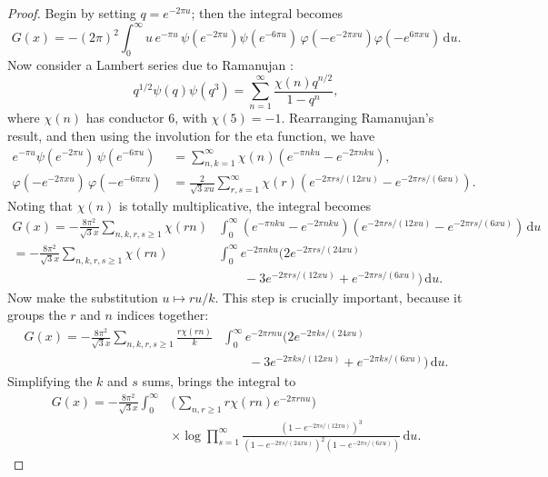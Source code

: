 \documentclass[12pt,reqno]{amsart}
\theoremstyle{remark}
\begin{document}
\begin{proof}
Begin by setting $q=e^{-2\pi u}$; then the integral becomes
\begin{equation*}
G(x)=-(2\pi)^2\int_{0}^{\infty}u\,e^{-\pi u}\,\psi(e^{-2\pi
u})\psi(e^{-6\pi u})\,\varphi(-e^{-2\pi x u})\varphi(-e^{6\pi x
u})\,{{\mathrm d}} u.
\end{equation*}
Now consider a Lambert series due to Ramanujan \cite[pg.~223, Entry~3.1]{Be3}:
\begin{equation*}
q^{1/2}\psi(q)\psi(q^3)=\sum_{n=1}^{\infty}\frac{\chi(n)q^{n/2}}{1-q^n},
\end{equation*}
where $\chi(n)$ has conductor $6$, with $\chi(5)=-1$. Rearranging
Ramanujan's result, and then using the involution for the eta
function, we have
\begin{align}
e^{-\pi u}\psi(e^{-2\pi u})\,\psi(e^{-6\pi u})&=\sum_{n,k=1}^{\infty}\chi(n)(e^{-\pi n k u}-e^{-2\pi n k u}),
\\
\varphi(-e^{-2\pi x u})\,\varphi(-e^{-6\pi x u})&=\frac{2}{\sqrt{3} x u}\sum_{r,s=1}^{\infty}\chi(r)(e^{-2\pi r s/(12x u)}-e^{-2\pi r s/(6x u)}).
\end{align}
Noting that $\chi(n)$ is totally multiplicative, the integral
becomes
\begin{align*}
G(x)
=-\frac{8\pi^2}{\sqrt{3} x}\sum_{n,k,r,s\ge 1}\chi(r n)
&\int_{0}^{\infty}(e^{-\pi n k u}-e^{-2\pi n k u})
(e^{-2\pi r s/(12x u)}-e^{-2\pi r s/(6x u)})\,{{\mathrm d}} u
\\
=-\frac{8\pi^2}{\sqrt{3} x}\sum_{n,k,r,s\ge 1}\chi(r n)
&\int_{0}^{\infty}e^{-2\pi n k u}(2e^{-2\pi r s/(24x u)}
\\ &\qquad
-3e^{-2\pi r s/(12x u)}+e^{-2\pi r s/(6x u)})\,{{\mathrm d}} u.
\end{align*}
Now make the substitution $u\mapsto r u/k$.  This step is
crucially important, because it groups the $r$ and $n$ indices
together:
\begin{align*}
G(x)=-\frac{8\pi^2}{\sqrt{3} x}\sum_{n,k,r,s\ge 1}\frac{r\chi(r n)}{k}
&\int_{0}^{\infty}e^{-2\pi r n u}(2e^{-2\pi k s/(24x u)}
\\ &\qquad
-3e^{-2\pi k s/(12x u)}+e^{-2\pi k s/(6x u)})\,{{\mathrm d}} u.
\end{align*}
Simplifying the $k$ and $s$ sums, brings the integral to
\begin{align*}
G(x)
=-\frac{8\pi^2}{\sqrt{3} x}\int_{0}^{\infty}
&\biggl(\sum_{n,r\ge1}r\chi(r n)e^{-2\pi r nu}\biggr)
\\ &\times
\log\prod_{s=1}^{\infty}\frac{(1-e^{-2\pi s/(12 x u)})^3}{(1-e^{-2\pi s/(24 x u)})^2(1-e^{-2\pi s/(6 x u)})}\,{{\mathrm d}} u.

\end{align*}
\end{proof}
\end{document}
